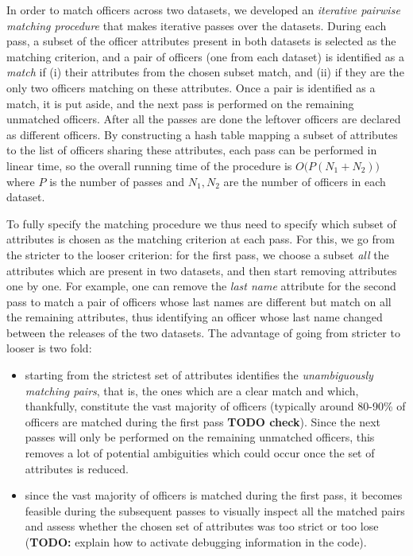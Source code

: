 \documentclass{article}
\begin{document}
In order to match officers across two datasets, we developed an \emph{iterative
pairwise matching procedure} that makes iterative passes over the datasets.
During each pass, a subset of the officer attributes present in both datasets
is selected as the matching criterion, and a pair of officers (one from each
dataset) is identified as a \emph{match} if (i) their attributes from the
chosen subset match, and (ii) if they are the only two officers matching on
these attributes. Once a pair is identified as a match, it is put aside, and
the next pass is performed on the remaining unmatched officers. After all the
passes are done the leftover officers are declared as different officers. By
constructing a hash table mapping a subset of attributes to the list of
officers sharing these attributes, each pass can be performed in linear time,
so the overall running time of the procedure is $O\big(P(N_1+N_2)\big)$ where
$P$ is the number of passes and $N_1, N_2$ are the number of officers in each
dataset.

To fully specify the matching procedure we thus need to specify which subset of
attributes is chosen as the matching criterion at each pass. For this, we go
from the stricter to the looser criterion: for the first pass, we choose
a subset \emph{all} the attributes which are present in two datasets, and then
start removing attributes one by one. For example, one can remove the
\emph{last name} attribute for the second pass to match a pair of officers
whose last names are different but match on all the remaining attributes, thus
identifying an officer whose last name changed between the releases of the two
datasets. The advantage of going from stricter to looser is two fold:
\begin{itemize}
	\item starting from the strictest set of attributes identifies the
		\emph{unambiguously matching pairs}, that is, the ones which are
		a clear match and which, thankfully, constitute the vast majority of
		officers (typically around 80-90\% of officers are matched during the
		first pass \textbf{TODO check}). Since the next passes will only be
		performed on the remaining unmatched officers, this removes a lot of
		potential ambiguities which could occur once the set of attributes is
		reduced.
	\item since the vast majority of officers is matched during the first pass,
		it becomes feasible during the subsequent passes to visually inspect all
		the matched pairs and assess whether the chosen set of attributes was
		too strict or too lose (\textbf{TODO:} explain how to activate
		debugging information in the code).
\end{itemize}
\end{document}
